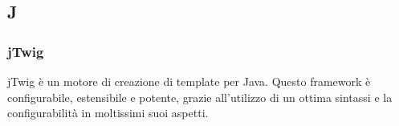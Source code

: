 \subsection*{J}

    \subsubsection*{jTwig}

jTwig è un motore di creazione di template per Java. Questo framework è configurabile, estensibile e potente, grazie all'utilizzo di un ottima sintassi e la configurabilità in moltissimi suoi aspetti.

